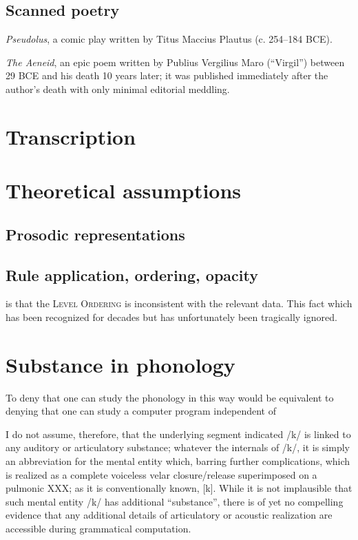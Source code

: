 \subsection{Scanned poetry}

\emph{Pseudolus}, a comic play written by Titus Maccius Plautus (c. 254--184 BCE).

\emph{The Aeneid}, an epic poem written by Publius Vergilius Maro (``Virgil'') between 29 BCE and his death 10 years later; it was published immediately after the author's death with only minimal editorial meddling.

\section{Transcription}

\section{Theoretical assumptions}

\subsection{Prosodic representations}

\subsection{Rule application, ordering, opacity}

is that the 
\textsc{Level Ordering} \citep{Siegel1974} is inconsistent with the relevant data. This fact which has been recognized for decades \citep{Aronoff1976} but has unfortunately been tragically ignored. 

\section{Substance in phonology}

To deny that one can study the phonology in this way would be equivalent to denying that one can study a computer program independent of

I do not assume, therefore, that the underlying segment indicated /k/ is linked to any auditory or articulatory substance; whatever the internals of /k/, it is simply an abbreviation for the mental entity which, barring further complications, which is realized as a complete voiceless velar closure/release superimposed on a pulmonic XXX; as it is conventionally known, [k].
While it is not implausible that such mental entity /k/ has additional ``substance'', there is of yet no compelling evidence that any additional details of articulatory or acoustic realization are accessible during grammatical computation.

